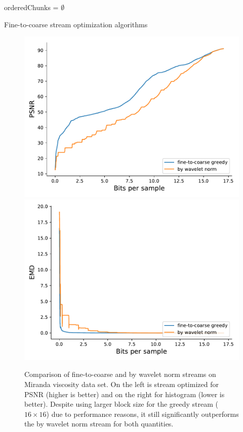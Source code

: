 \begin{algorithm}
  orderedChunks = $\emptyset$\;

  \caption{Fine-to-coarse stream optimization algorithms}
\end{algorithm}

\begin{figure}
        \centering
        \includegraphics[width=0.48\linewidth]{img/figure4_new/rmse-miranda-viscosity}
        \includegraphics[width=0.48\linewidth]{img/figure4_new/histogram-miranda-viscosity}
        \caption{Comparison of fine-to-coarse and by wavelet norm streams on Miranda viscosity data
                 set. On the left is stream optimized for PSNR (higher is better) and on the right
                 for histogram (lower is better). Despite using larger block size for the greedy
                 stream ($16 \times 16$) due to performance reasons, it still significantly
                 outperforms the by wavelet norm stream for both quantities.}
\end{figure}


